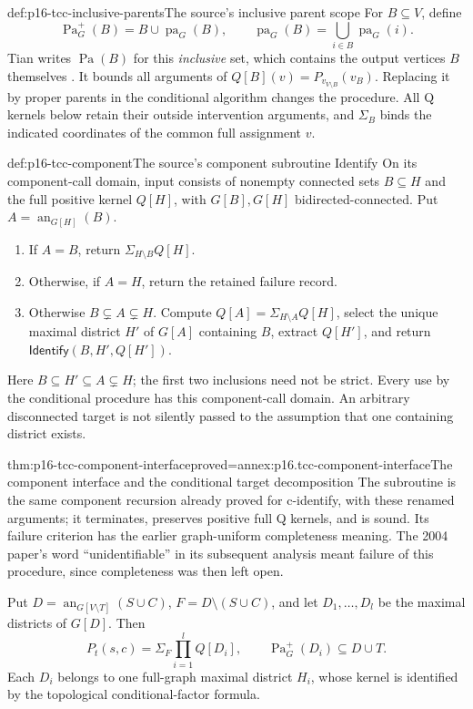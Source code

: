 \begin{hbdefinition}{def:p16-tcc-inclusive-parents}{The source's inclusive parent scope}
For \(B\subseteq V\), define
\[
 \operatorname{Pa}^{+}_G(B)=B\cup\operatorname{pa}_G(B),
 \qquad \operatorname{pa}_G(B)=\bigcup_{i\in B}\operatorname{pa}_G(i).
\]
Tian writes \(\operatorname{Pa}(B)\) for this \emph{inclusive}
set, which contains the output vertices \(B\) themselves
\cite[Section~3, after Eq.~(5)]{Tian2004ConditionalCausalEffects}.
It bounds all arguments of \(Q[B](v)=P_{v_{V\setminus B}}(v_B)\).
Replacing it by proper parents in the conditional algorithm changes
the procedure. All Q kernels below retain their outside intervention
arguments, and \(\Sigma_B\) binds the indicated coordinates
of the common full assignment \(v\).
\end{hbdefinition}

\begin{hbmethod}{def:p16-tcc-component}{The source's component subroutine Identify}
On its component-call domain, input consists of nonempty connected
sets \(B\subseteq H\) and the full positive kernel \(Q[H]\),
with \(G[B],G[H]\) bidirected-connected. Put
\(A=\operatorname{an}_{G[H]}(B)\).
\begin{enumerate}
\item If \(A=B\), return \(\Sigma_{H\setminus B}Q[H]\).
\item Otherwise, if \(A=H\), return the retained failure record.
\item Otherwise \(B\subsetneq A\subsetneq H\). Compute
      \(Q[A]=\Sigma_{H\setminus A}Q[H]\), select the unique
      maximal district \(H'\) of \(G[A]\) containing \(B\),
      extract \(Q[H']\), and return
      \(\mathsf{Identify}(B,H',Q[H'])\).
\end{enumerate}
Here \(B\subseteq H'\subseteq A\subsetneq H\);
the first two inclusions need not be strict. Every use by the
conditional procedure has this component-call domain. An arbitrary
disconnected target is not silently passed to the assumption that
one containing district exists.
\end{hbmethod}

\begin{hblemma}{thm:p16-tcc-component-interface}{proved=annex:p16.tcc-component-interface}{The component interface and the conditional target decomposition}
The subroutine is the same component recursion already proved for
c-identify, with these renamed arguments; it terminates, preserves
positive full Q kernels, and is sound. Its failure criterion has
the earlier graph-uniform completeness meaning. The 2004 paper's
word ``unidentifiable'' in its subsequent analysis meant failure
of this procedure, since completeness was then left open.

Put \(D=\operatorname{an}_{G[V\setminus T]}(S\cup C)\),
\(F=D\setminus(S\cup C)\), and let \(D_1,\ldots,D_l\)
be the maximal districts of \(G[D]\). Then
\[
 P_t(s,c)=\Sigma_F\prod_{i=1}^l Q[D_i],
 \qquad \operatorname{Pa}^{+}_G(D_i)\subseteq D\cup T.
\]
Each \(D_i\) belongs to one full-graph maximal district \(H_i\),
whose kernel is identified by the topological conditional-factor formula.
\end{hblemma}


